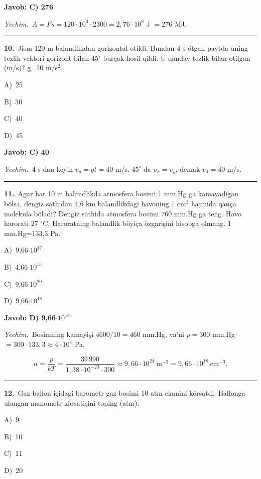 \documentclass[11pt,a4paper]{article}
\newcommand{\opt}[2]{\hspace*{4mm}#1)\ #2\par}
\begin{document}
\noindent\colorbox{gray!12}{\parbox{\dimexpr\linewidth-2\fboxsep}{\textbf{Javob: C) 276}}}\par\smallskip
\noindent\textit{Yechim.}\ $A=Fs=120\cdot10^3\cdot2300=2{,}76\cdot10^8$ J $=276$ MJ.\par\par\medskip\hrule\medskip
{}\noindent\begin{minipage}{\linewidth}
\textbf{10.}\ Jism 120 m balandlikdan gorizontal otildi. Bundan 4 s ötgan paytda uning tezlik vektori gorizont bilan 45$^\circ$ burçak hosil qildi. U qanday tezlik bilan otilgan (m/s)? g=10 m/s$^{2}$.\par\smallskip
\opt{A}{25}
\opt{B}{30}
\opt{C}{40}
\opt{D}{45}
\end{minipage}\vspace{2pt}\par
\noindent\colorbox{gray!12}{\parbox{\dimexpr\linewidth-2\fboxsep}{\textbf{Javob: C) 40}}}\par\smallskip
\noindent\textit{Yechim.}\ 4 s dan keyin $v_y=gt=40$ m/s. $45^\circ$ da $v_x=v_y$, demak $v_0=40$ m/s.\par\par\medskip\hrule\medskip
{}\noindent\begin{minipage}{\linewidth}
\textbf{11.}\ Agar har 10 m balandlikda atmosfera bosimi 1 mm.Hg ga kamayadigan bölsa, dengiz sathidan 4,6 km balandlikdagi havoning 1 cm$^{3}$ hajmida qança molekula böladi? Dengiz sathida atmosfera bosimi 760 mm.Hg ga teng. Havo harorati 27 $^\circ$C. Haroratning balandlik böyiça özgarişini hisobga olmang. 1 mm.Hg=133,3 Pa.\par\smallskip
\opt{A}{9,66$\cdot10^{17}$}
\opt{B}{4,66$\cdot10^{15}$}
\opt{C}{9,66$\cdot10^{20}$}
\opt{D}{9,66$\cdot10^{18}$}
\end{minipage}\vspace{2pt}\par
\noindent\colorbox{gray!12}{\parbox{\dimexpr\linewidth-2\fboxsep}{\textbf{Javob: D) 9,66$\cdot10^{18}$}}}\par\smallskip
\noindent\textit{Yechim.}\ Bosimning kamayişi $4600/10=460$ mm.Hg, ya’ni $p=300$ mm.Hg $=300\cdot133{,}3\approx4\cdot10^4$ Pa.\par
\[n=\frac{p}{kT}=\frac{39\,990}{1{,}38\cdot10^{-23}\cdot300}\approx9{,}66\cdot10^{24}\ \text{m}^{-3}=9{,}66\cdot10^{18}\ \text{cm}^{-3}.\]\par\medskip\hrule\medskip
{}\noindent\begin{minipage}{\linewidth}
\textbf{12.}\ Gaz ballon içidagi barometr gaz bosimi 10 atm ekanini körsatdi. Ballonga ulangan manometr körsatişini toping (atm).\par\smallskip
\opt{A}{9}
\opt{B}{10}
\opt{C}{11}
\opt{D}{20}
\end{minipage}\vspace{2pt}\par
\end{document}
